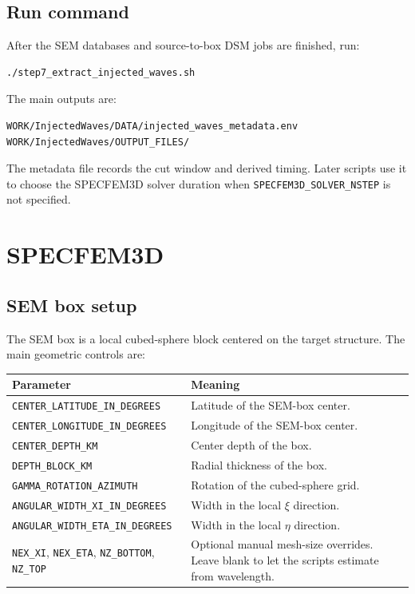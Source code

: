 \documentclass[11pt,oneside]{book}
\newcommand{\specfem}{SPECFEM3D}
\DeclareRobustCommand{\code}[1]{\nolinkurl{#1}}
\begin{document}
\section{Run command}

After the SEM databases and source-to-box DSM jobs are finished, run:
\begin{lstlisting}
./step7_extract_injected_waves.sh
\end{lstlisting}

The main outputs are:
\begin{lstlisting}
WORK/InjectedWaves/DATA/injected_waves_metadata.env
WORK/InjectedWaves/OUTPUT_FILES/
\end{lstlisting}
The metadata file records the cut window and derived timing. Later scripts use
it to choose the \specfem{} solver duration when \code{SPECFEM3D_SOLVER_NSTEP}
is not specified.

\chapter{SPECFEM3D}

\section{SEM box setup}

The SEM box is a local cubed-sphere block centered on the target structure.
The main geometric controls are:
\begin{longtable}{L{0.34\textwidth}L{0.57\textwidth}}
\toprule
Parameter & Meaning \\
\midrule
\code{CENTER_LATITUDE_IN_DEGREES} & Latitude of the SEM-box center. \\
\code{CENTER_LONGITUDE_IN_DEGREES} & Longitude of the SEM-box center. \\
\code{CENTER_DEPTH_KM} & Center depth of the box. \\
\code{DEPTH_BLOCK_KM} & Radial thickness of the box. \\
\code{GAMMA_ROTATION_AZIMUTH} & Rotation of the cubed-sphere grid. \\
\code{ANGULAR_WIDTH_XI_IN_DEGREES} & Width in the local \(\xi\) direction. \\
\code{ANGULAR_WIDTH_ETA_IN_DEGREES} & Width in the local \(\eta\) direction. \\
\code{NEX_XI}, \code{NEX_ETA}, \code{NZ_BOTTOM}, \code{NZ_TOP} & Optional
manual mesh-size overrides. Leave blank to let the scripts estimate from
wavelength. \\
\bottomrule
\end{longtable}
\end{document}
